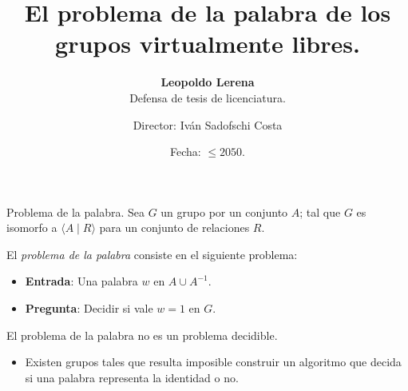 \documentclass[aspectratio=169, 11pt]{beamer}
\title{El problema de la palabra de los grupos virtualmente libres.}
\subtitle{\textbf{Leopoldo Lerena} \\
		Defensa de tesis de licenciatura.}
\date{Fecha: $\le 2050$.}
\author{Director: Iván Sadofschi Costa}
\institute{Universidad de Buenos Aires}
\begin{document}
	\maketitle

	
	
	
	\begin{frame}[fragile]{Problema de la palabra.}
		Sea $G$ un grupo \fg por un conjunto $A$; 
		tal que $G$ es isomorfo a $\langle A \mid R \rangle$ para un conjunto de relaciones $R$.
		
		El \emph{problema de la palabra} consiste en el siguiente problema:
	
		\begin{itemize}
					\item 
						\textbf{Entrada}: Una palabra $w$ en $A \cup A^{-1}$.
					
					\item 
						\textbf{Pregunta}: Decidir si vale $w=1$ en $G$.
		\end{itemize}

		El problema de la palabra no es un problema \alert{decidible}.
		\begin{itemize}
			\item 
				Existen grupos tales que resulta imposible construir un algoritmo que decida si una palabra representa la identidad o no.
		\end{itemize}
		

	\end{frame}
\end{document}
